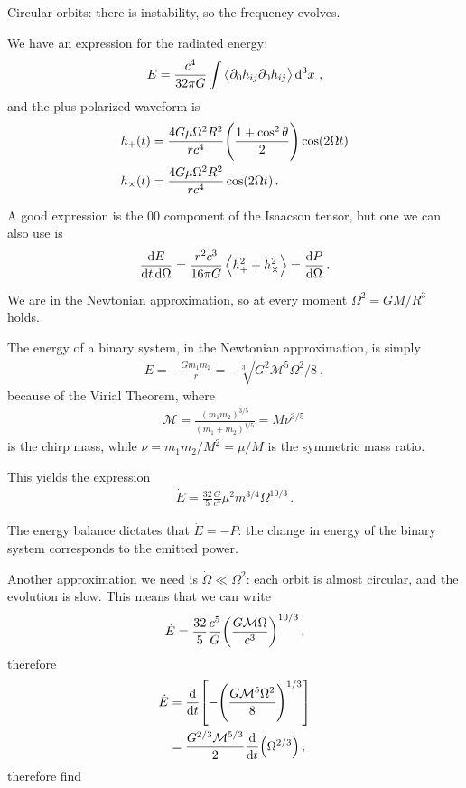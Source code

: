 \documentclass[main.tex]{subfiles}
\begin{document}

Circular orbits: there is instability, so the frequency evolves. 

We have an expression for the radiated energy: 
%
\begin{align}
E = \frac{c^{4}}{32 \pi G} \int \expval{ \partial_0 h_{ij} \partial_0 h_{ij}} \dd[3]{x}
\,,
\end{align}
%
and the plus-polarized waveform is 
%
\begin{align}
h_{+} (t) &= \frac{4 G \mu \Omega^2R^2}{r c^{4}} \qty(\frac{1 + \cos^2 \theta }{2})  \cos( 2 \Omega t ) \\
h_{\times } (t) &= \frac{4 G \mu \Omega^2 R^2}{r c^{4}} 
\cos(2 \Omega t)
\,.
\end{align}
%

A good expression is the 00 component of the Isaacson tensor, but one we can also use is 
%
\begin{align}
\frac{ \dd{E}}{ \dd{t} \dd{\Omega }} = \frac{r^2 c^3}{16 \pi G}
\expval{\dot{h}_+^2 + \dot{h}_{\times}^2} = \dv{P}{\Omega } 
\,.
\end{align}

We are in the Newtonian approximation, so at every moment \(\Omega^2 = GM / R^3\) holds. 

The energy of a binary system, in the Newtonian approximation, is simply 
%
\begin{align}
E = - \frac{G m_1 m_2 }{r}
= - \sqrt[3]{G^2 \mathcal{M}^{5} \Omega^2 / 8}
\,,
\end{align}
%
because of the Virial Theorem, where 
%
\begin{align}
\mathcal{M} = \frac{(m_1m_2 )^{3/5}}{(m_1 + m_2 )^{1/5}} = M \nu^{3/5}
\,
\end{align}
%
is the chirp mass, while \(\nu = m_1 m_2 / M^2 = \mu / M\) is the symmetric mass ratio. 

This yields the expression 
%
\begin{align}
\dot{E} = \frac{32}{5} \frac{G}{c^{5}} \mu^2 m^{3/4} \Omega^{10/3}
\,.
\end{align}

The energy balance dictates that \(\dot{E} = - P \): the change in energy of the binary system corresponds to the emitted power. 

Another approximation we need is \(\dot{\Omega} \ll \Omega^2\): each orbit is almost circular, and the evolution is slow. 
This means that we can write 
%
\begin{align}
\dot{E} = \frac{32}{5} \frac{c^{5}}{G} \qty( \frac{G \mathcal{M} \Omega }{c^3})^{10/3}
\,,
\end{align}
%
therefore 
%
\begin{align}
\dot{E} &= \dv{t} \qty[- \qty(\frac{G \mathcal{M}^{5} \Omega^2}{8})^{1/3}]  \\
&= \frac{G^{2/3} \mathcal{M}^{5/3}}{2} \dv{t} \qty( \Omega^{2/3} )
\,,
\end{align}
%
therefore find 
\end{document}
